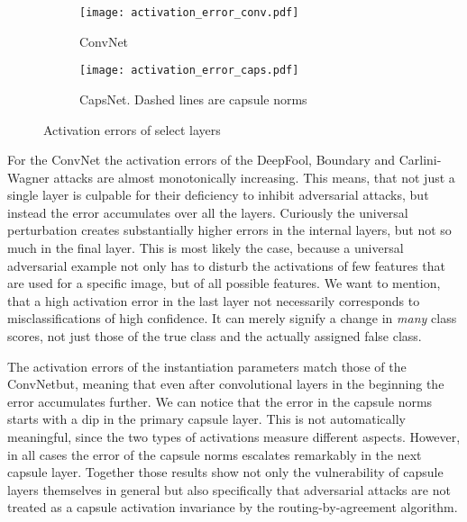 \begin{figure}
	\centering
	
	\begin{subfigure}{.5\textwidth}
		\texttt{[image: activation\_error\_conv.pdf]}
		\caption{ConvNet}
	\end{subfigure}%
	\begin{subfigure}{.5\textwidth}
		\texttt{[image: activation\_error\_caps.pdf]}
		\caption{CapsNet. Dashed lines are capsule norms}
	\end{subfigure}
	\caption[Activation errors]{Activation errors of select layers}
	\label{fig:activation}
\end{figure}

For the ConvNet the activation errors of the DeepFool, Boundary and Carlini-Wagner attacks are almost monotonically increasing. This means, that not just a single layer is culpable for their deficiency to inhibit adversarial attacks, but instead the error accumulates over all the layers.
Curiously the universal perturbation creates substantially higher errors in the internal layers, but not so much in the final layer.
This is most likely the case, because a universal adversarial example not only has to disturb the activations of few features that are used for a specific image, but of all possible features. 
We want to mention, that a high activation error in the last layer not necessarily corresponds to misclassifications of high confidence.
It can merely signify a change in \emph{many} class scores, not just those of the true class and the actually assigned false class.

The activation errors of the instantiation parameters match those of the ConvNetbut, meaning that even after convolutional layers in the beginning the error accumulates further.
We can notice that the error in the capsule norms starts with a dip in the primary capsule layer.
This is not automatically meaningful, since the two types of activations measure different aspects.
However, in all cases the error of the capsule norms escalates remarkably in the next capsule layer.
Together those results show not only the vulnerability of capsule layers themselves in general but also specifically that adversarial attacks are not treated as a capsule activation invariance by the routing-by-agreement algorithm.
